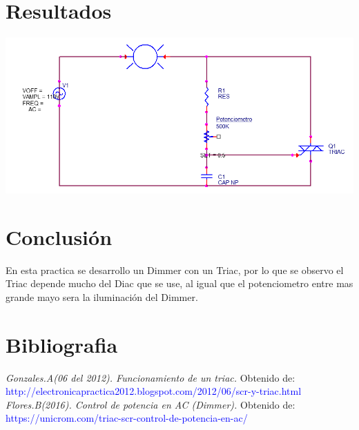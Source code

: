 \documentclass[12pt,a4paper]{article}
\begin{document}
\section{Resultados}
\includegraphics[scale=0.7]{2.PNG} 
\section{Conclusión}
En esta practica se desarrollo un Dimmer con un Triac, por lo que se observo el Triac depende mucho del Diac que se use, al igual que el potenciometro entre mas grande mayo sera la iluminación del Dimmer.
\section{Bibliografia} 
 \emph{Gonzales.A(06 del 2012). Funcionamiento de un triac.}
 Obtenido de:
 \textcolor{blue}{http://electronicapractica2012.blogspot.com/2012/06/scr-y-triac.html}\\[0.3cm]
 
 \emph{Flores.B(2016). Control de potencia en AC (Dimmer).}
 Obtenido de:
 \textcolor{blue}{https://unicrom.com/triac-scr-control-de-potencia-en-ac/}\\[0.3cm]
\end{document}
